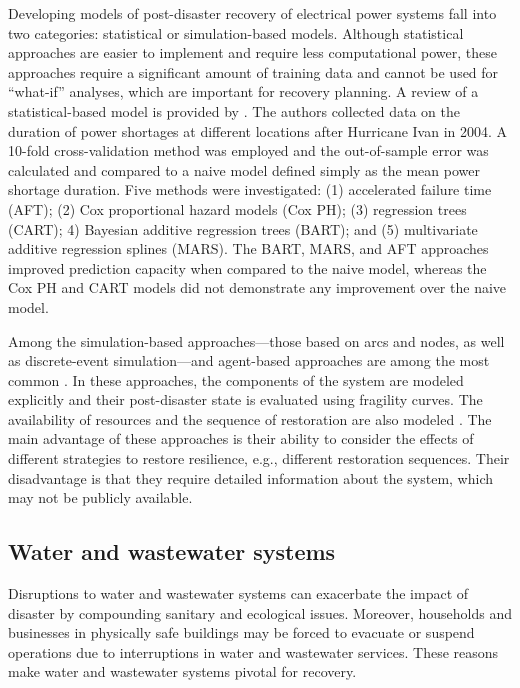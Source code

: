 Developing models of post-disaster recovery of electrical power systems fall into two categories:  statistical or simulation-based models. Although statistical approaches are easier to implement and require less computational power, these approaches require a significant amount of training data and cannot be used for ``what-if'' analyses, which are important for recovery planning. A review of a statistical-based model is provided by \citet{liu2007statistical}. The authors collected data on the duration of power shortages at different locations after Hurricane Ivan in 2004. A 10-fold cross-validation method was employed and the out-of-sample error was calculated and compared to a naive model defined simply as the mean power shortage duration. Five methods were investigated: (1) accelerated failure time (AFT); (2) Cox proportional hazard models (Cox PH); (3) regression trees (CART); 4) Bayesian additive regression trees (BART); and (5) multivariate additive regression splines (MARS). The BART, MARS, and AFT approaches improved prediction capacity when compared to the naive model, whereas the Cox PH and CART models did not demonstrate any improvement over the naive model. \ 

Among the simulation-based approaches---those based on arcs and nodes, as well as discrete-event simulation---and agent-based approaches are among the most common \citep{Eusgeld2008a,ouyang2014review,sun2019resilience}. In these approaches, the components of the system are modeled explicitly and their post-disaster state is evaluated using fragility curves. The availability of resources and the sequence of restoration are also modeled \citep{ouyang2014multi}. The main advantage of these approaches is their ability to consider the effects of different strategies to restore resilience, e.g., different restoration sequences. Their disadvantage is that they require detailed information about the system, which may not be publicly available. \ 

\subsection{Water and wastewater systems}
Disruptions to water and wastewater systems can exacerbate the impact of disaster by compounding sanitary and ecological issues. Moreover, households and businesses in physically safe buildings may be forced to evacuate or suspend operations due to interruptions in water and wastewater services. These reasons make water and wastewater systems pivotal for recovery.\

